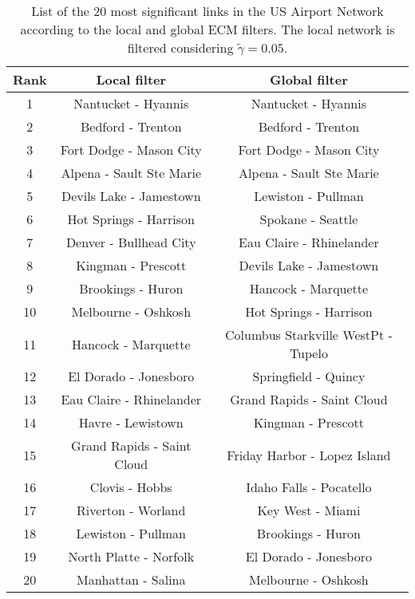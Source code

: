 \documentclass[aps,twocolumn,superscriptaddress]{revtex4-1}
\begin{document}
%
%
%
\begin{table}[h!]
\centering
 \begin{tabular}{||c | c | c||} 
 \hline
 Rank & Local filter & Global filter \\ [0.5ex] 
 \hline\hline
 1 & Nantucket - Hyannis & Nantucket - Hyannis \\ 
 \hline
 2 & Bedford - Trenton & Bedford - Trenton \\
 \hline
 3 & Fort Dodge - Mason City & Fort Dodge - Mason City \\
 \hline
 4 & Alpena - Sault Ste Marie & Alpena - Sault Ste Marie \\
 \hline
 5 & Devils Lake - Jamestown & Lewiston - Pullman \\  
 \hline
 6 & Hot Springs - Harrison & Spokane - Seattle \\ 
 \hline
 7 & Denver - Bullhead City & Eau Claire - Rhinelander \\
 \hline
 8 & Kingman - Prescott & Devils Lake - Jamestown \\
 \hline
 9 & Brookings - Huron & Hancock - Marquette \\
 \hline
 10 & Melbourne - Oshkosh & Hot Springs - Harrison \\ 
 \hline
 11 & Hancock - Marquette & Columbus Starkville WestPt - Tupelo \\
 \hline
 12 & El Dorado - Jonesboro & Springfield - Quincy \\
 \hline
 13 & Eau Claire - Rhinelander & Grand Rapids - Saint Cloud \\
 \hline
 14 & Havre - Lewistown & Kingman - Prescott \\ 
 \hline
 15 & Grand Rapids - Saint Cloud & Friday Harbor - Lopez Island \\
 \hline
 16 & Clovis - Hobbs & Idaho Falls - Pocatello \\
 \hline
 17 & Riverton - Worland & Key West - Miami \\ 
 \hline
 18 & Lewiston - Pullman & Brookings - Huron \\
 \hline
 19 & North Platte - Norfolk & El Dorado - Jonesboro \\
 \hline
 20 & Manhattan - Salina & Melbourne - Oshkosh \\
 \hline
\end{tabular}
%
\caption{List of the 20 most significant links in the US Airport Network according to the local and global ECM filters. The local network is filtered considering $\widetilde{\gamma} = 0.05$.}
\label{tab:airports_global_local_20_significative}
\end{table}
\end{document}
